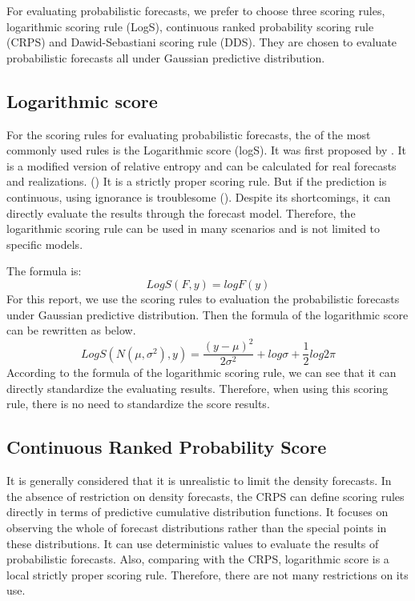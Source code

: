 \documentclass{monashthesis}
\theoremstyle{definition}
\theoremstyle{definition}
\theoremstyle{definition}
\theoremstyle{remark}
\begin{document}
For evaluating probabilistic forecasts, we prefer to choose three
scoring rules, logarithmic scoring rule (LogS), continuous ranked
probability scoring rule (CRPS) and Dawid-Sebastiani scoring rule (DDS).
They are chosen to evaluate probabilistic forecasts all under Gaussian
predictive distribution.

\subsection{Logarithmic score}\label{logarithmic-score}

For the scoring rules for evaluating probabilistic forecasts, the of the
most commonly used rules is the Logarithmic score (logS). It was first
proposed by \textcite{G52}. It is a modified version of relative entropy
and can be calculated for real forecasts and realizations.
(\textcite{RS02}) It is a strictly proper scoring rule. But if the
prediction is continuous, using ignorance is troublesome
(\textcite{P10}). Despite its shortcomings, it can directly evaluate the
results through the forecast model. Therefore, the logarithmic scoring
rule can be used in many scenarios and is not limited to specific
models.

The formula is: \[
      LogS(F,y)=logF(y)
  \] For this report, we use the scoring rules to evaluation the
probabilistic forecasts under Gaussian predictive distribution. Then the
formula of the logarithmic score can be rewritten as below. \[
      LogS(N(\mu,\sigma^2),y)=\frac{(y-\mu)^2}{2\sigma^2}+log\sigma+\frac{1}{2}log2\pi
  \] According to the formula of the logarithmic scoring rule, we can
see that it can directly standardize the evaluating results. Therefore,
when using this scoring rule, there is no need to standardize the score
results.

\subsection{Continuous Ranked Probability
Score}\label{continuous-ranked-probability-score}

It is generally considered that it is unrealistic to limit the density
forecasts. In the absence of restriction on density forecasts, the CRPS
can define scoring rules directly in terms of predictive cumulative
distribution functions. It focuses on observing the whole of forecast
distributions rather than the special points in these distributions. It
can use deterministic values to evaluate the results of probabilistic
forecasts. Also, comparing with the CRPS, logarithmic score is a local
strictly proper scoring rule. Therefore, there are not many restrictions
on its use.
\end{document}
